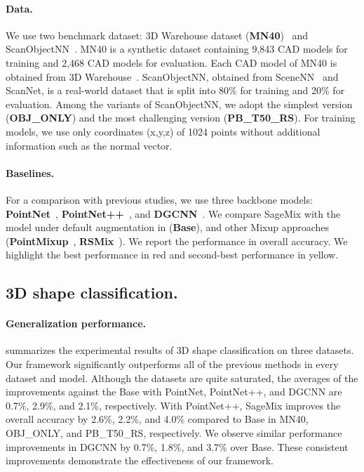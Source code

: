 \documentclass{article}
\begin{document}
\begin{table}[t!]
\vspace{8pt}
\end{table}  \paragraph{Data.} We use two benchmark dataset: 3D Warehouse dataset (\textbf{MN40})~\cite{xu2021image2point} and ScanObjectNN~\cite{uy2019revisiting}. MN40 is a synthetic dataset containing 9,843 CAD models for training and 2,468 CAD models for evaluation. Each CAD model of MN40 is obtained from 3D Warehouse~\cite{3dwarehouse}. ScanObjectNN, obtained from SceneNN~\cite{hua2016scenenn} and ScanNet\cite{dai2017scannet}, is a real-world dataset that is split into 80\% for training and 20\% for evaluation. Among the variants of ScanObjectNN, we adopt the simplest version (\textbf{OBJ\_ONLY}) and the most challenging version (\textbf{PB\_T50\_RS}). For training models, we use only coordinates (x,y,z) of 1024 points without additional information such as the normal vector.

\paragraph{Baselines.} For a comparison with previous studies, we use three backbone models: \textbf{PointNet}~\cite{qi2017pointnet}, \textbf{PointNet++}~\cite{qi2017pointnet++}, and \textbf{DGCNN}~\cite{wang2019dynamic}. We compare SageMix with the model under default augmentation in \cite{qi2017pointnet,qi2017pointnet++,wang2019dynamic, uy2019revisiting} (\textbf{Base}), 
and other Mixup approaches (\textbf{PointMixup}~\cite{chen2020pointmixup}, \textbf{RSMix}~\cite{lee2021regularization}). 
We report the performance in overall accuracy. We highlight the best performance in red and second-best performance in yellow.


\subsection{3D shape classification.}

\label{sec:exp.1}
\paragraph{Generalization performance.}  summarizes the experimental results of 3D shape classification on three datasets. Our framework significantly outperforms all of the previous methods in every dataset and model.
Although the datasets are quite saturated, the averages of the improvements against the Base with PointNet, PointNet++, and DGCNN are 0.7\%, 2.9\%, and 2.1\%, respectively.
With PointNet++, SageMix improves the overall accuracy by 2.6\%, 2.2\%, and 4.0\% compared to Base in MN40, OBJ\_ONLY, and PB\_T50\_RS, respectively. We observe similar performance improvements in DGCNN by 0.7\%, 1.8\%, and 3.7\% over Base. These consistent improvements demonstrate the effectiveness of our framework.
\end{document}
